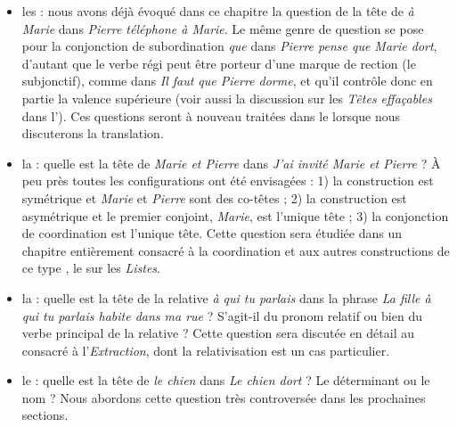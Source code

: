\begin{itemize}
\item les : nous avons déjà évoqué dans ce chapitre la question de la tête de \textit{à Marie} dans \textit{Pierre téléphone à Marie}. Le même genre de question se pose pour la conjonction de subordination \textit{que} dans \textit{Pierre pense que Marie dort}, d’autant que le verbe régi peut être porteur d’une marque de rection (le subjonctif), comme dans \textit{Il faut que Pierre dorme}, et qu’il contrôle donc en partie la valence supérieure (voir aussi la discussion sur les \textit{Têtes effaçables} dans l’). Ces questions seront à nouveau traitées dans le  lorsque nous discuterons la translation.
\item la : quelle est la tête de \textit{Marie et Pierre} dans \textit{J’ai invité Marie et Pierre} ? À peu près toutes les configurations ont été envisagées : 1) la construction est symétrique et \textit{Marie} et \textit{Pierre} sont des co-têtes ; 2) la construction est asymétrique et le premier conjoint, \textit{Marie}, est l’unique tête ; 3) la conjonction de coordination est l’unique tête. Cette question sera étudiée dans un chapitre entièrement consacré à la coordination et aux autres constructions de ce type , le  sur les \textit{Listes}.
\item la : quelle est la tête de la relative \textit{à qui tu parlais} dans la phrase \textit{La fille à qui tu parlais habite dans ma rue} ? S’agit-il du pronom relatif ou bien du verbe principal de la relative ? Cette question sera discutée en détail au  consacré à l’\textit{Extraction}, dont la relativisation est un cas particulier.
\item le : quelle est la tête de \textit{le chien} dans \textit{Le chien dort} ? Le déterminant ou le nom ? Nous abordons cette question très controversée dans les prochaines sections.
\end{itemize}


